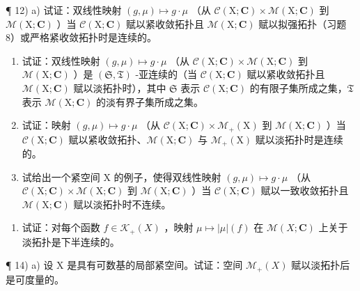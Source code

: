 ¶ 12) a) 试证：双线性映射 \((g, \mu) \mapsto g \cdot \mu\) （从 \(\mathcal{C}(\mathrm{X}; \mathbf{C}) \times \mathcal{M}(\mathrm{X}; \mathbf{C})\) 到 \(\mathcal{M}(\mathrm{X}; \mathbf{C})\) ）当 \(\mathcal{C}(\mathrm{X}; \mathbf{C})\) 赋以紧收敛拓扑且 \(\mathcal{M}(\mathrm{X};\mathbf{C})\) 赋以拟强拓扑（习题 8）或严格紧收敛拓扑时是连续的。

\begin{enumerate}
\def\labelenumi{\alph{enumi})}
\setcounter{enumi}{1}
\item
  试证：双线性映射 \((g,\mu)\mapsto g\cdot \mu\) （从 \(\mathcal{C}(\mathrm{X};\mathbf{C})\times \mathcal{M}(\mathrm{X};\mathbf{C})\) 到 \(\mathcal{M}(\mathrm{X};\mathbf{C})\) ）是 \((\mathfrak{S},\mathfrak{T})\) -亚连续的（当 \(\mathcal{C}(\mathrm{X};\mathbf{C})\) 赋以紧收敛拓扑且 \(\mathcal{M}(\mathrm{X};\mathbf{C})\) 赋以淡拓扑时），其中 \(\mathfrak{S}\) 表示 \(\mathcal{C}(\mathrm{X};\mathbf{C})\) 的有限子集所成之集，\(\mathfrak{T}\) 表示 \(\mathcal{M}(\mathrm{X};\mathbf{C})\) 的淡有界子集所成之集。
\item
  试证：映射 \((g, \mu) \mapsto g \cdot \mu\) （从 \(\mathcal{C}(\mathrm{X};\mathbf{C}) \times \mathcal{M}_{+}(\mathrm{X})\) 到 \(\mathcal{M}(\mathrm{X};\mathbf{C})\) ）当 \(\mathcal{C}(\mathrm{X};\mathbf{C})\) 赋以紧收敛拓扑、\(\mathcal{M}(\mathrm{X};\mathbf{C})\) 与 \(\mathcal{M}_{+}(\mathrm{X})\) 赋以淡拓扑时是连续的。
\item
  试给出一个紧空间 X 的例子，使得双线性映射 \((g,\mu)\mapsto g\cdot\mu\) （从 \(\mathcal{C}(\mathrm{X};\mathbf{C})\times\mathcal{M}(\mathrm{X};\mathbf{C})\) 到 \(\mathcal{M}(\mathrm{X};\mathbf{C})\) ）当 \(\mathcal{C}(\mathrm{X};\mathbf{C})\) 赋以一致收敛拓扑且 \(\mathcal{M}(\mathrm{X};\mathbf{C})\) 赋以淡拓扑时不连续。
\end{enumerate}

\begin{enumerate}
\def\labelenumi{\arabic{enumi})}
\setcounter{enumi}{12}
\tightlist
\item
  试证：对每个函数 \(f \in \mathcal{K}_{+}(X)\) ，映射 \(\mu \mapsto |\mu|(f)\) 在 \(\mathcal{M}(X; \mathbf{C})\) 上关于淡拓扑是下半连续的。
\end{enumerate}

¶ 14) a) 设 X 是具有可数基的局部紧空间。试证：空间 \(\mathcal{M}_{+}(X)\) 赋以淡拓扑后是可度量的。


